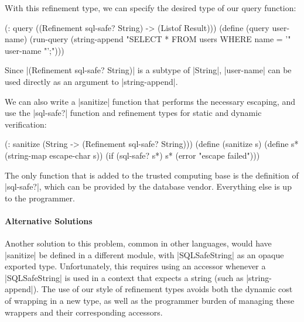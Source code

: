 \begin{schemeregion}
With this refinement type, we can specify the desired type of our
query function:

\begin{schemedisplay}
(: query ((Refinement sql-safe? String) -> (Listof Result)))
(define (query user-name)
  (run-query
   (string-append 
     "SELECT * FROM users WHERE name = '" user-name "';")))
\end{schemedisplay}
\noindent
Since \scheme|(Refinement sql-safe? String)| is a subtype of
\scheme|String|, \scheme|user-name|  can be used directly as an
argument to \scheme|string-append|.  

We can also write a \scheme|sanitize| function that performs the
necessary escaping, and use the \scheme|sql-safe?| function and
refinement types for static and dynamic verification:

\begin{schemedisplay}
(: sanitize (String -> (Refinement sql-safe? String)))
(define (sanitize s)
  (define s* (string-map escape-char s))
  (if (sql-safe? s*) 
      s*
      (error "escape failed")))
\end{schemedisplay}
\noindent
The only function that is added to the trusted computing
base is the definition of \scheme|sql-safe?|, which can be provided by
the database vendor.  Everything else is up to the programmer.

\paragraph{Alternative Solutions}

Another solution to this problem, common in other languages, would have \scheme|sanitize| be
defined in a different module, with \scheme|SQLSafeString| as an
opaque exported type.  Unfortunately, this requires using an accessor
whenever a \scheme|SQLSafeString| is used in a context that expects a
string (such as \scheme|string-append|).  The use of our style  of refinement types
avoids both the dynamic cost of wrapping in a new type, as well as the
programmer burden of managing these wrappers and their corresponding
accessors.  

\end{schemeregion}
